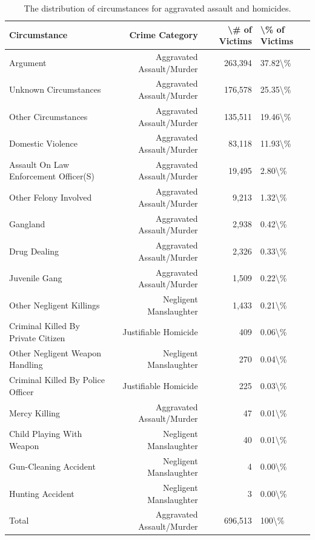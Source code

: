 \documentclass[
  12pt,
  openany]{book}
\begin{document}
\begin{longtable}[t]{lrrl}
\caption{\label{tab:victimAggAssault}The distribution of circumstances for aggravated assault and homicides.}\\
\toprule
Circumstance & Crime Category & \textbackslash{}\# of Victims & \textbackslash{}\% of Victims\\
\midrule
Argument & Aggravated Assault/Murder & 263,394 & 37.82\textbackslash{}\%\\
Unknown Circumstances & Aggravated Assault/Murder & 176,578 & 25.35\textbackslash{}\%\\
Other Circumstances & Aggravated Assault/Murder & 135,511 & 19.46\textbackslash{}\%\\
Domestic Violence & Aggravated Assault/Murder & 83,118 & 11.93\textbackslash{}\%\\
Assault On Law Enforcement Officer(S) & Aggravated Assault/Murder & 19,495 & 2.80\textbackslash{}\%\\
\addlinespace
Other Felony Involved & Aggravated Assault/Murder & 9,213 & 1.32\textbackslash{}\%\\
Gangland & Aggravated Assault/Murder & 2,938 & 0.42\textbackslash{}\%\\
Drug Dealing & Aggravated Assault/Murder & 2,326 & 0.33\textbackslash{}\%\\
Juvenile Gang & Aggravated Assault/Murder & 1,509 & 0.22\textbackslash{}\%\\
Other Negligent Killings & Negligent Manslaughter & 1,433 & 0.21\textbackslash{}\%\\
\addlinespace
Criminal Killed By Private Citizen & Justifiable Homicide & 409 & 0.06\textbackslash{}\%\\
Other Negligent Weapon Handling & Negligent Manslaughter & 270 & 0.04\textbackslash{}\%\\
Criminal Killed By Police Officer & Justifiable Homicide & 225 & 0.03\textbackslash{}\%\\
Mercy Killing & Aggravated Assault/Murder & 47 & 0.01\textbackslash{}\%\\
Child Playing With Weapon & Negligent Manslaughter & 40 & 0.01\textbackslash{}\%\\
\addlinespace
Gun-Cleaning Accident & Negligent Manslaughter & 4 & 0.00\textbackslash{}\%\\
Hunting Accident & Negligent Manslaughter & 3 & 0.00\textbackslash{}\%\\
Total & Aggravated Assault/Murder & 696,513 & 100\textbackslash{}\%\\
\bottomrule
\end{longtable}
\end{document}
